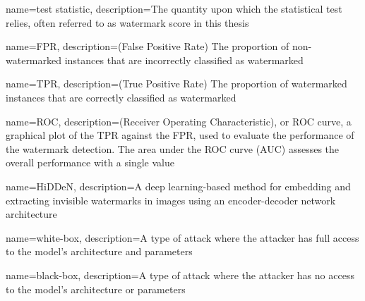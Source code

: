 {
    name={test statistic},
    description={The quantity upon which the statistical test relies, often referred to as watermark score in this thesis}
}


{
    name={FPR},
    description={(False Positive Rate) The proportion of non-watermarked instances that are incorrectly classified as watermarked}
}

{
    name={TPR},
    description={(True Positive Rate) The proportion of watermarked instances that are correctly classified as watermarked}
}

{
    name={ROC},
    description={(Receiver Operating Characteristic), or ROC curve, a graphical plot of the TPR against the FPR, used to evaluate the performance of the watermark detection. The area under the ROC curve (AUC) assesses the overall performance with a single value}
}

{
    name={HiDDeN},
    description={A deep learning-based method for embedding and extracting invisible watermarks in images using an encoder-decoder network architecture}
}

{
    name={white-box},
    description={A type of attack where the attacker has full access to the model's architecture and parameters}
}

{
    name={black-box},
    description={A type of attack where the attacker has no access to the model's architecture or parameters}
}
